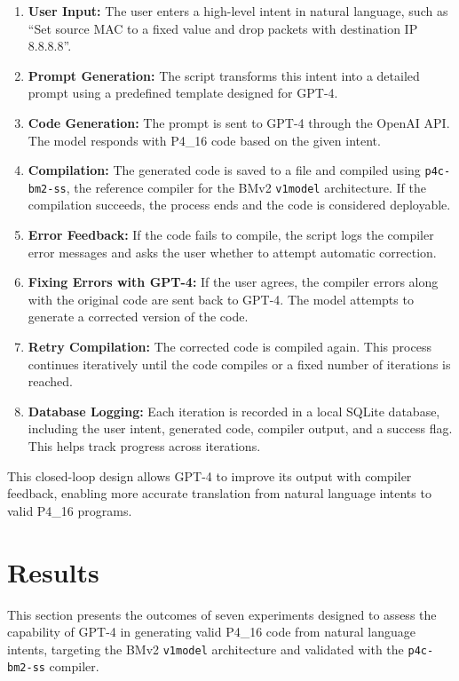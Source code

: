 \documentclass[sigconf]{acmart}
\begin{document}
\begin{enumerate}
    \item \textbf{User Input:} The user enters a high-level intent in natural language, such as ``Set source MAC to a fixed value and drop packets with destination IP 8.8.8.8''.
    
    \item \textbf{Prompt Generation:} The script transforms this intent into a detailed prompt using a predefined template designed for GPT-4.
    
    \item \textbf{Code Generation:} The prompt is sent to GPT-4 through the OpenAI API. The model responds with P4\_16 code based on the given intent.
    
    \item \textbf{Compilation:} The generated code is saved to a file and compiled using \texttt{p4c-bm2-ss}, the reference compiler for the BMv2 \texttt{v1model} architecture. If the compilation succeeds, the process ends and the code is considered deployable.
    
    \item \textbf{Error Feedback:} If the code fails to compile, the script logs the compiler error messages and asks the user whether to attempt automatic correction.
    
    \item \textbf{Fixing Errors with GPT-4:} If the user agrees, the compiler errors along with the original code are sent back to GPT-4. The model attempts to generate a corrected version of the code.
    
    \item \textbf{Retry Compilation:} The corrected code is compiled again. This process continues iteratively until the code compiles or a fixed number of iterations is reached.
    
    \item \textbf{Database Logging:} Each iteration is recorded in a local SQLite database, including the user intent, generated code, compiler output, and a success flag. This helps track progress across iterations.
\end{enumerate}

This closed-loop design allows GPT-4 to improve its output with compiler feedback, enabling more accurate translation from natural language intents to valid P4\_16 programs.

\section{Results}
This section presents the outcomes of seven experiments designed to assess the capability of GPT-4 in generating valid P4\_16 code from natural language intents, targeting the BMv2 \texttt{v1model} architecture and validated with the \texttt{p4c-bm2-ss} compiler.
\end{document}
